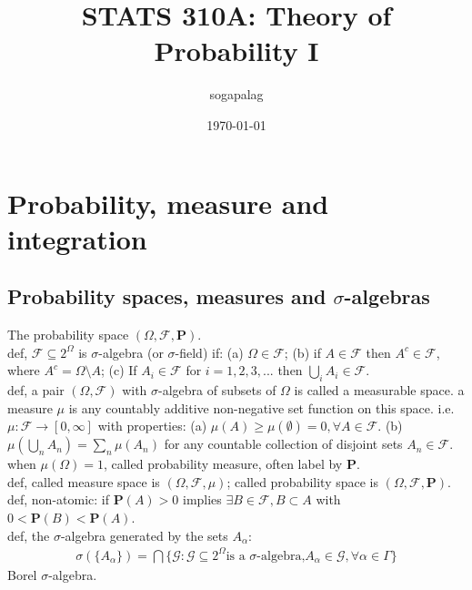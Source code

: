\documentclass[paper=a4, fontsize=11pt]{scrartcl} %
\title{STATS 310A: Theory of Probability I}
\author{sogapalag}
\date{\normalsize\today}
\numberwithin{equation}{section} %
\numberwithin{figure}{section} %
\numberwithin{table}{section} %
\begin{document}
\maketitle

\section{Probability, measure and integration}
\subsection{Probability spaces, measures and $\sigma$-algebras}
The probability space $(\Omega,\mathcal{F},\mathbf{P})$.\\
def, $\mathcal{F}\subseteq 2^\Omega$ is $\sigma$-algebra (or $\sigma$-field) if: (a) $\Omega\in \mathcal{F}$; (b) if $A\in \mathcal{F}$ then $A^c\in \mathcal{F}$, where $A^c=\Omega\setminus A$; (c) If $A_i\in \mathcal{F}$ for $i=1,2,3,...$ then $\bigcup_i A_i\in \mathcal{F}$.\\
def, a pair $(\Omega, \mathcal{F})$ with $\sigma$-algebra of subsets of $\Omega$ is called a measurable space. a measure $\mu$ is any countably additive non-negative set function on this space. i.e. $\mu: \mathcal{F}\rightarrow [0,\infty]$ with properties: (a) $\mu(A)\geq \mu(\emptyset)=0, \forall A\in \mathcal{F}$. (b) $\mu(\bigcup_n A_n) = \sum_n \mu(A_n) $ for any countable collection of disjoint sets $A_n\in \mathcal{F}$.\\
when $\mu(\Omega)=1$, called probability measure, often label by $\mathbf{P}$.\\
def, called measure space is $(\Omega,\mathcal{F},\mu)$; called probability space is $(\Omega, \mathcal{F}, \mathbf{P})$.\\
def, non-atomic: if $\mathbf{P}(A)>0$ implies $\exists B\in \mathcal{F}, B\subset A$ with $0<\mathbf{P}(B)<\mathbf{P}(A)$.\\
def, the $\sigma$-algebra generated by the sets $A_\alpha$:
\begin{align}
	\sigma(\{A_\alpha\}) = \bigcap \{\mathcal{G}: \mathcal{G}\subseteq 2^\Omega \text{is a $\sigma$-algebra,} A_\alpha\in \mathcal{G},\forall\alpha\in \Gamma\}
\end{align}
Borel $\sigma$-algebra.\\
\end{document}
